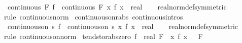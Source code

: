 \begin{isabellebody}
\ \ {\isachardoublequoteopen}continuous\ F\ f\ {\isasymLongrightarrow}\ continuous\ F\ {\isacharparenleft}{\kern0pt}{\isasymlambda}x{\isachardot}{\kern0pt}\ {\isasymbar}f\ x\ {\isacharcolon}{\kern0pt}{\isacharcolon}{\kern0pt}\ real{\isasymbar}{\isacharparenright}{\kern0pt}{\isachardoublequoteclose}\isanewline
%
\isadelimproof
\ \ %
\endisadelimproof
%
\isatagproof
{}\isamarkupfalse%
\ real{\isacharunderscore}{\kern0pt}norm{\isacharunderscore}{\kern0pt}def{\isacharbrackleft}{\kern0pt}symmetric{\isacharbrackright}{\kern0pt}\ \isamarkupfalse%
\ {\isacharparenleft}{\kern0pt}rule\ continuous{\isacharunderscore}{\kern0pt}norm{\isacharparenright}{\kern0pt}%
\endisatagproof
{\isafoldproof}%
%
\isadelimproof
\isanewline
%
\endisadelimproof
\isanewline
{}\isamarkupfalse%
\ continuous{\isacharunderscore}{\kern0pt}on{\isacharunderscore}{\kern0pt}rabs\ {\isacharbrackleft}{\kern0pt}continuous{\isacharunderscore}{\kern0pt}intros{\isacharbrackright}{\kern0pt}{\isacharcolon}{\kern0pt}\isanewline
\ \ {\isachardoublequoteopen}continuous{\isacharunderscore}{\kern0pt}on\ s\ f\ {\isasymLongrightarrow}\ continuous{\isacharunderscore}{\kern0pt}on\ s\ {\isacharparenleft}{\kern0pt}{\isasymlambda}x{\isachardot}{\kern0pt}\ {\isasymbar}f\ x\ {\isacharcolon}{\kern0pt}{\isacharcolon}{\kern0pt}\ real{\isasymbar}{\isacharparenright}{\kern0pt}{\isachardoublequoteclose}\isanewline
%
\isadelimproof
\ \ %
\endisadelimproof
%
\isatagproof
{}\isamarkupfalse%
\ real{\isacharunderscore}{\kern0pt}norm{\isacharunderscore}{\kern0pt}def{\isacharbrackleft}{\kern0pt}symmetric{\isacharbrackright}{\kern0pt}\ \isamarkupfalse%
\ {\isacharparenleft}{\kern0pt}rule\ continuous{\isacharunderscore}{\kern0pt}on{\isacharunderscore}{\kern0pt}norm{\isacharparenright}{\kern0pt}%
\endisatagproof
{\isafoldproof}%
%
\isadelimproof
\isanewline
%
\endisadelimproof
\isanewline
{}\isamarkupfalse%
\ tendsto{\isacharunderscore}{\kern0pt}rabs{\isacharunderscore}{\kern0pt}zero{\isacharcolon}{\kern0pt}\ {\isachardoublequoteopen}{\isacharparenleft}{\kern0pt}f\ {\isasymlonglongrightarrow}\ {\isacharparenleft}{\kern0pt}{}{\isacharcolon}{\kern0pt}{\isacharcolon}{\kern0pt}real{\isacharparenright}{\kern0pt}{\isacharparenright}{\kern0pt}\ F\ {\isasymLongrightarrow}\ {\isacharparenleft}{\kern0pt}{\isacharparenleft}{\kern0pt}{\isasymlambda}x{\isachardot}{\kern0pt}\ {\isasymbar}f\ x{\isasymbar}{\isacharparenright}{\kern0pt}\ {\isasymlonglongrightarrow}\ {}{\isacharparenright}{\kern0pt}\ F{\isachardoublequoteclose}\isanewline

\end{isabellebody}
